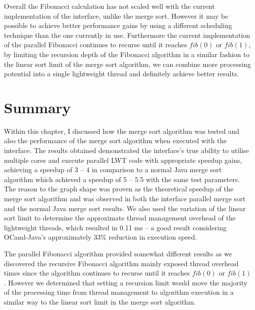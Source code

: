 \documentclass[12pt,twoside,notitlepage]{report}
\begin{document}
%
%

%
%
Overall the Fibonacci calculation has not scaled well with the current implementation of the interface, unlike the merge sort. However it may be possible to achieve better performance gains by using a different scheduling technique
than the one currently in use. Furthermore the current implementation of the parallel Fibonacci continues to recurse until it reaches $fib(0)$ or $fib(1)$, by limiting the recursion depth of the Fibonacci algorithm in a similar
fashion to the linear sort limit of the merge sort algorithm, we can combine more processing potential into a single lightweight thread and definitely achieve better results.

\section{Summary}
Within this chapter, I discussed how the merge sort algorithm was tested and also the performance of the merge sort algorithm when executed with the interface. The results obtained demonstrated the interface's true ability to utilise
multiple cores and execute parallel LWT code with appropriate speedup gains, achieving a speedup of 3 -- 4 in comparison to a normal Java merge sort algorithm which achieved a speedup of 5 -- 5.5 with the same test parameters. The
reason to the graph shape was proven as the theoretical speedup of the merge sort algorithm and was observed in both the interface parallel merge sort and the normal Java merge sort results. We also used the variation of the linear
sort limit to determine the approximate thread management overhead of the lightweight threads, which resulted in 0.11 ms -- a good result considering OCaml-Java's approximately 33\% reduction in execution speed.

The parallel Fibonacci algorithm provided somewhat different results as we discovered the recursive Fibonacci algorithm mainly exposed thread overhead times since the algorithm continues to recurse until it reaches $fib(0)$ or
$fib(1)$. However we determined that setting a recursion limit would move the majority of the processing time from thread management to algorithm execution in a similar way to the linear sort limit in the merge sort algorithm.
\end{document}

